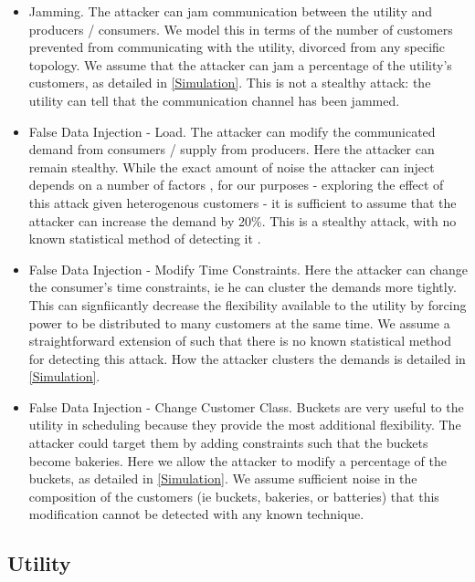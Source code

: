 \documentclass[conference]{IEEEtran}
\begin{document}
\begin{itemize}
\item Jamming. The attacker can jam communication between the utility and producers / consumers. We model this in terms of the number of customers prevented from communicating with the utility, divorced from any specific topology. We assume that the attacker can jam a percentage of the utility's customers, as detailed in \ref{Simulation}. This is not a stealthy attack: the utility can tell that the communication channel has been jammed.

\item False Data Injection - Load. The attacker can modify the communicated demand from consumers / supply from producers. Here the attacker can remain stealthy. While the exact amount of noise the attacker can inject depends on a number of factors \cite{yuan2011modeling}, for our purposes - exploring the effect of this attack given heterogenous customers - it is sufficient to assume that the attacker can increase the demand by 20\%. This is a stealthy attack, with no known statistical method of detecting it \cite{yuan2011modeling}.

\item False Data Injection - Modify Time Constraints. Here the attacker can change the consumer's time constraints, ie he can cluster the demands more tightly. This can signfiicantly decrease the flexibility available to the utility by forcing power to be distributed to many customers at the same time. We assume a straightforward extension of \cite{yuan2011modeling} such that there is no known statistical method for detecting this attack.  How the attacker clusters the demands is detailed in \ref{Simulation}.

\item False Data Injection - Change Customer Class. Buckets are very useful to the utility in scheduling because they provide
the most additional flexibility. The attacker could target them by adding constraints such that the buckets become bakeries.  Here we allow the attacker to modify a percentage of the buckets, as detailed in \ref{Simulation}.  We assume sufficient noise in the composition of the customers (ie buckets, bakeries, or batteries) that this modification cannot be detected with any known technique.

\end{itemize}

\subsection{Utility}
\label{Utility2}
\end{document}
